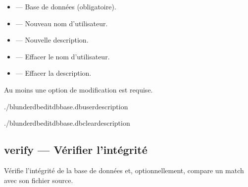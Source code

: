 \documentclass[letterpaper,10pt,french]{sphinxmanual}
\begin{document}
\sphinxAtStartPar
{}
\begin{itemize}
\item {} 
\sphinxAtStartPar
{} — Base de données (obligatoire).

\item {} 
\sphinxAtStartPar
{} — Nouveau nom d’utilisateur.

\item {} 
\sphinxAtStartPar
{} — Nouvelle description.

\item {} 
\sphinxAtStartPar
{} — Effacer le nom d’utilisateur.

\item {} 
\sphinxAtStartPar
{} — Effacer la description.

\end{itemize}

\sphinxAtStartPar
Au moins une option de modification est requise.

\sphinxAtStartPar
{}

\begin{sphinxVerbatim}[commandchars=\\\{\}]
./blunderdbedit\PYGZhy{}\PYGZhy{}dbbase.db\PYGZhy{}\PYGZhy{}user\PYGZhy{}\PYGZhy{}description

./blunderdbedit\PYGZhy{}\PYGZhy{}dbbase.db\PYGZhy{}\PYGZhy{}clear\PYGZhy{}description
\end{sphinxVerbatim}


\subsection{verify — Vérifier l’intégrité}
\label{\detokenize{cli:verify-verifier-l-integrite}}
\sphinxAtStartPar
Vérifie l’intégrité de la base de données et, optionnellement, compare un match
avec son fichier source.
\end{document}
